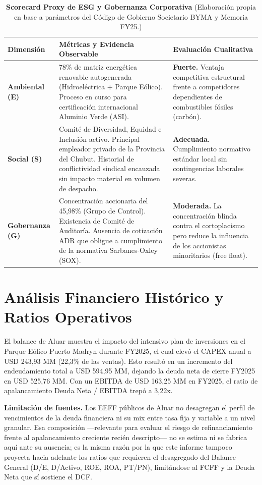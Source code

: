 \documentclass[10pt,a4paper]{article}
\begin{document}
\vspace{0.15cm}
\begin{table}[H]
\centering
\caption{\textbf{Scorecard Proxy de ESG y Gobernanza Corporativa} {\small\color{gsgray} (Elaboración propia en base a parámetros del Código de Gobierno Societario BYMA y Memoria FY25.)}}
\small
\begin{tabular}{p{2.5cm}p{6.5cm}p{4.5cm}}
\toprule
\textbf{Dimensión} & \textbf{Métricas y Evidencia Observable} & \textbf{Evaluación Cualitativa} \\
\midrule
\textbf{Ambiental (E)} & 78\% de matriz energética renovable autogenerada (Hidroeléctrica + Parque Eólico). Proceso en curso para certificación internacional Aluminio Verde (ASI). & \textbf{Fuerte.} Ventaja competitiva estructural frente a competidores dependientes de combustibles fósiles (carbón). \\
\midrule
\textbf{Social (S)} & Comité de Diversidad, Equidad e Inclusión activo. Principal empleador privado de la Provincia del Chubut. Historial de conflictividad sindical encauzada sin impacto material en volumen de despacho. & \textbf{Adecuada.} Cumplimiento normativo estándar local sin contingencias laborales severas. \\
\midrule
\textbf{Gobernanza (G)} & Concentración accionaria del 45,98\% (Grupo de Control). Existencia de Comité de Auditoría. Ausencia de cotización ADR que obligue a cumplimiento de la normativa Sarbanes-Oxley (SOX). & \textbf{Moderada.} La concentración blinda contra el cortoplacismo pero reduce la influencia de los accionistas minoritarios (free float). \\
\bottomrule
\end{tabular}
\end{table}

\section{Análisis Financiero Histórico y Ratios Operativos}
El balance de Aluar muestra el impacto del intensivo plan de inversiones en el Parque Eólico Puerto Madryn durante FY2025, el cual elevó el CAPEX anual a USD 243,93 MM (22,3\% de las ventas). Esto resultó en un incremento del endeudamiento total a USD 594,95 MM, dejando la deuda neta de cierre FY2025 en USD 525,76 MM. Con un EBITDA de USD 163,25 MM en FY2025, el ratio de apalancamiento Deuda Neta / EBITDA trepó a 3,22x.

\textbf{Limitación de fuentes.} Los EEFF públicos de Aluar no desagregan el perfil de vencimientos de la deuda financiera ni su mix entre tasa fija y variable a un nivel granular. Esa composición —relevante para evaluar el riesgo de refinanciamiento frente al apalancamiento creciente recién descripto— no se estima ni se fabrica aquí ante su ausencia; es la misma razón por la que este informe tampoco proyecta hacia adelante los ratios que requieren el desagregado del Balance General (D/E, D/Activo, ROE, ROA, PT/PN), limitándose al FCFF y la Deuda Neta que sí sostiene el DCF.
\end{document}
